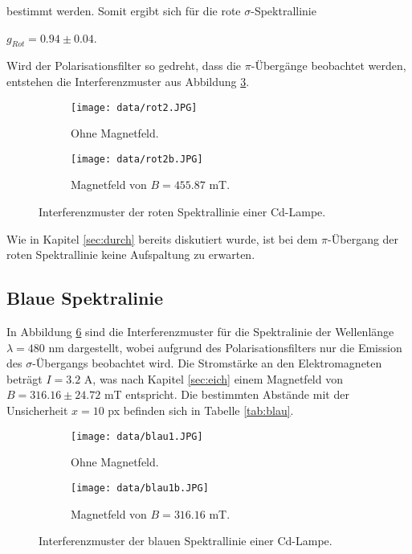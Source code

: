 \noindent
bestimmt werden. Somit ergibt sich für die rote $\sigma$-Spektrallinie

\begin{center}
    $g_{Rot} = 0.94 \pm 0.04$.
\end{center}

\noindent
Wird der Polarisationsfilter so gedreht, dass die $\pi$-Übergänge beobachtet werden, entstehen die Interferenzmuster aus Abbildung \ref{fig:rot22}.

\begin{figure}[H]
	\centering
	\begin{subfigure}[b]{0.8\textwidth}
		\centering
		\texttt{[image: data/rot2.JPG]}
		\caption{Ohne Magnetfeld.}
    \label{fig:rot1}
	\end{subfigure}
	
	\begin{subfigure}[b]{0.8\textwidth}
		\centering
		\texttt{[image: data/rot2b.JPG]}
		\caption{Magnetfeld von $B= 455.87$ mT.}
    \label{fig:rot1b}
	\end{subfigure}
    \caption{Interferenzmuster der roten Spektrallinie einer Cd-Lampe.}
\label{fig:rot22}
\end{figure}

\noindent
Wie in Kapitel \ref{sec:durch}
bereits diskutiert wurde, ist bei dem $\pi$-Übergang der roten Spektrallinie keine Aufspaltung zu erwarten.

\subsection{Blaue Spektralinie}
In Abbildung \ref{fig:blau} sind die Interferenzmuster für die Spektralinie der Wellenlänge $\lambda=480$ nm dargestellt, 
wobei aufgrund des Polarisationsfilters nur die Emission des $\sigma$-Übergangs beobachtet wird.
Die Stromstärke an den Elektromagneten beträgt $I=3.2$ A, was nach Kapitel \ref{sec:eich} einem Magnetfeld von $B = 316.16 \pm 24.72$ mT entspricht.
Die bestimmten Abstände mit der Unsicherheit $x=10$ px befinden sich in Tabelle \ref{tab:blau}.


\begin{figure}[H]
	\centering
	\begin{subfigure}[b]{0.8\textwidth}
		\centering
		\texttt{[image: data/blau1.JPG]}
		\caption{Ohne Magnetfeld.}
    \label{fig:blau1}
	\end{subfigure}
	
	\begin{subfigure}[b]{0.8\textwidth}
		\centering
		\texttt{[image: data/blau1b.JPG]}
		\caption{Magnetfeld von $B= 316.16$ mT.}
    \label{fig:rot1b}
	\end{subfigure}
    \caption{Interferenzmuster der blauen Spektrallinie einer Cd-Lampe.}
\label{fig:blau}
\end{figure}


